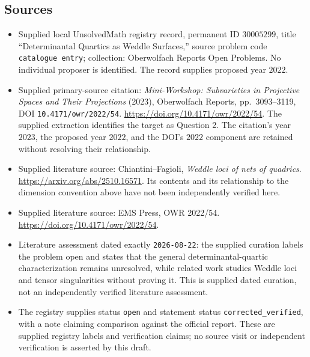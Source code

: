 \documentclass[11pt]{article}
\begin{document}
\subsection{Sources}
\begin{itemize}
\item Supplied local UnsolvedMath registry record, permanent ID \(30005299\), title ``Determinantal Quartics as Weddle Surfaces,'' source problem code \texttt{catalogue entry}; collection: Oberwolfach Reports Open Problems. No individual proposer is identified. The record supplies proposed year \(2022\).
\item Supplied primary-source citation: \emph{Mini-Workshop: Subvarieties in Projective Spaces and Their Projections} (2023), Oberwolfach Reports, pp.\ 3093--3119, DOI \texttt{10.4171/owr/2022/54}. \url{https://doi.org/10.4171/owr/2022/54}. The supplied extraction identifies the target as Question 2. The citation's year \(2023\), the proposed year \(2022\), and the DOI's \(2022\) component are retained without resolving their relationship.
\item Supplied literature source: Chiantini--Fagioli, \emph{Weddle loci of nets of quadrics}. \url{https://arxiv.org/abs/2510.16571}. Its contents and its relationship to the dimension convention above have not been independently verified here.
\item Supplied literature source: EMS Press, OWR 2022/54. \url{https://doi.org/10.4171/owr/2022/54}.
\item Literature assessment dated exactly \texttt{2026-08-22}: the supplied curation labels the problem open and states that the general determinantal-quartic characterization remains unresolved, while related work studies Weddle loci and tensor singularities without proving it. This is supplied dated curation, not an independently verified literature assessment.
\item The registry supplies status \texttt{open} and statement status \texttt{corrected\_verified}, with a note claiming comparison against the official report. These are supplied registry labels and verification claims; no source visit or independent verification is asserted by this draft.
\end{itemize}
\end{document}
